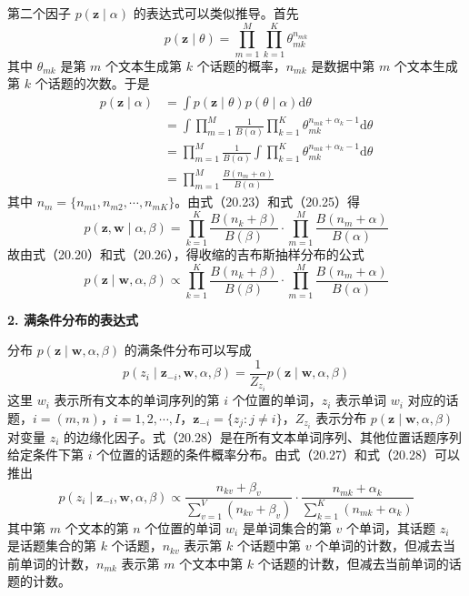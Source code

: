 \documentclass[UTF8, 12pt, fontset=fandol, oneside]{ctexart}
\begin{document}
第二个因子 $p(\mathbf{z}\mid\alpha)$ 的表达式可以类似推导。首先
\begin{equation}
p(\mathbf{z}\mid\theta)=\prod_{m=1}^M\prod_{k=1}^K \theta_{mk}^{n_{mk}}
\tag{20.24}
\end{equation}
其中 $\theta_{mk}$ 是第 $m$ 个文本生成第 $k$ 个话题的概率，$n_{mk}$ 是数据中第 $m$ 个文本生成第 $k$ 个话题的次数。于是
\begin{equation}
\begin{aligned}
p(\mathbf{z}\mid\alpha)
&=\int p(\mathbf{z}\mid\theta)p(\theta\mid\alpha)\mathrm{d}\theta\\
&=\int \prod_{m=1}^M \frac{1}{B(\alpha)}\prod_{k=1}^K \theta_{mk}^{n_{mk}+\alpha_k-1}\mathrm{d}\theta\\
&=\prod_{m=1}^M \frac{1}{B(\alpha)}\int \prod_{k=1}^K \theta_{mk}^{n_{mk}+\alpha_k-1}\mathrm{d}\theta\\
&=\prod_{m=1}^M \frac{B(n_m+\alpha)}{B(\alpha)}
\end{aligned}
\tag{20.25}
\end{equation}
其中 $n_m=\{n_{m1},n_{m2},\cdots,n_{mK}\}$。由式（20.23）和式（20.25）得
\begin{equation}
p(\mathbf{z},\mathbf{w}\mid\alpha,\beta)=\prod_{k=1}^K \frac{B(n_k+\beta)}{B(\beta)}\cdot \prod_{m=1}^M \frac{B(n_m+\alpha)}{B(\alpha)}
\tag{20.26}
\end{equation}
故由式（20.20）和式（20.26），得收缩的吉布斯抽样分布的公式
\begin{equation}
p(\mathbf{z}\mid\mathbf{w},\alpha,\beta)\propto \prod_{k=1}^K \frac{B(n_k+\beta)}{B(\beta)}\cdot \prod_{m=1}^M \frac{B(n_m+\alpha)}{B(\alpha)}
\tag{20.27}
\end{equation}

\noindent\textbf{2. 满条件分布的表达式}

分布 $p(\mathbf{z}\mid\mathbf{w},\alpha,\beta)$ 的满条件分布可以写成
\begin{equation}
p(z_i\mid\mathbf{z}_{-i},\mathbf{w},\alpha,\beta)=\frac{1}{Z_{z_i}}p(\mathbf{z}\mid\mathbf{w},\alpha,\beta)
\tag{20.28}
\end{equation}
这里 $w_i$ 表示所有文本的单词序列的第 $i$ 个位置的单词，$z_i$ 表示单词 $w_i$ 对应的话题，$i=(m,n)$，$i=1,2,\cdots,I$，$\mathbf{z}_{-i}=\{z_j:j\ne i\}$，$Z_{z_i}$ 表示分布 $p(\mathbf{z}\mid\mathbf{w},\alpha,\beta)$ 对变量 $z_i$ 的边缘化因子。式（20.28）是在所有文本单词序列、其他位置话题序列给定条件下第 $i$ 个位置的话题的条件概率分布。由式（20.27）和式（20.28）可以推出
\begin{equation}
p(z_i\mid\mathbf{z}_{-i},\mathbf{w},\alpha,\beta)\propto \frac{n_{kv}+\beta_v}{\sum_{v=1}^V(n_{kv}+\beta_v)}\cdot \frac{n_{mk}+\alpha_k}{\sum_{k=1}^K(n_{mk}+\alpha_k)}
\tag{20.29}
\end{equation}
其中第 $m$ 个文本的第 $n$ 个位置的单词 $w_i$ 是单词集合的第 $v$ 个单词，其话题 $z_i$ 是话题集合的第 $k$ 个话题，$n_{kv}$ 表示第 $k$ 个话题中第 $v$ 个单词的计数，但减去当前单词的计数，$n_{mk}$ 表示第 $m$ 个文本中第 $k$ 个话题的计数，但减去当前单词的话题的计数。
\end{document}

